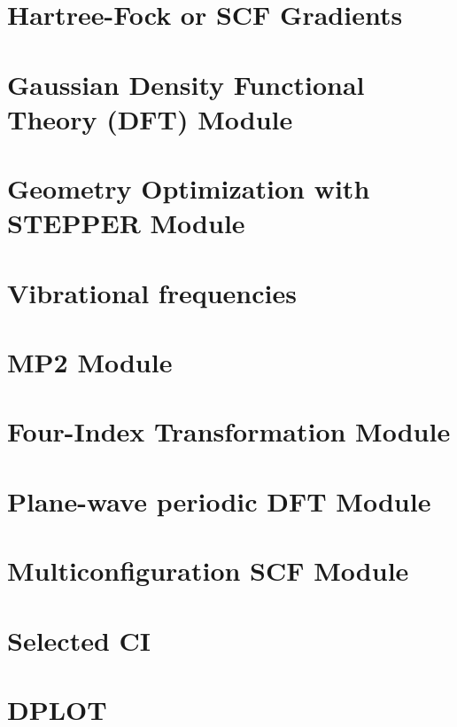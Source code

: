 \section{Hartree-Fock or SCF Gradients}


\section{Gaussian Density Functional Theory (DFT) Module}


\section{Geometry Optimization with STEPPER Module}


\section{Vibrational frequencies}


\section{MP2 Module}


\section{Four-Index Transformation Module} 


\section{Plane-wave periodic DFT Module}


\section{Multiconfiguration SCF Module}


\section{Selected CI}




\section{DPLOT}


